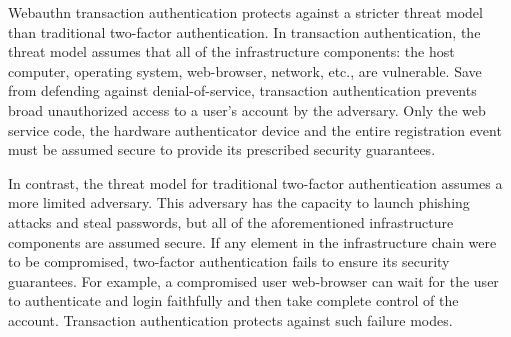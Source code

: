 
Webauthn transaction authentication protects against a stricter threat model than traditional two-factor authentication. In transaction authentication, the threat model assumes that all of the infrastructure components: the host computer, operating system, web-browser, network, etc., are vulnerable. Save from defending against denial-of-service, transaction authentication prevents broad unauthorized access to a user's account by the adversary. Only the web service code, the hardware authenticator device and the entire registration event must be assumed secure to provide its prescribed security guarantees.

In contrast, the threat model for traditional two-factor authentication assumes a more limited adversary. This adversary has the capacity to launch phishing attacks and steal passwords, but all of the aforementioned infrastructure components are assumed secure. If any element in the infrastructure chain were to be compromised, two-factor authentication fails to ensure its security guarantees. For example, a compromised user web-browser can wait for the user to authenticate and login faithfully and then take complete control of the account. Transaction authentication protects against such failure modes.






